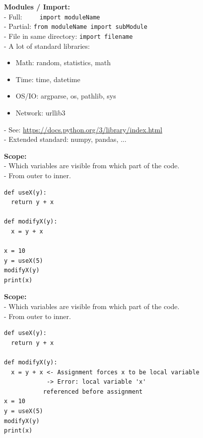 \documentclass{beamer}
\begin{document}
\begin{frame}[fragile]
	\textbf{Modules / Import:}\\
	- Full:~~~~~\texttt{import moduleName}\\
	- Partial: \texttt{from moduleName import subModule} \\
	- File in same directory: \texttt{import filename}\\
	- A lot of standard libraries:
	\begin{itemize}
		\item Math: random, statistics, math
		\item Time: time, datetime 
		\item OS/IO: argparse, os, pathlib, sys
		\item Network: urllib3
	\end{itemize}
	- See: \url{https://docs.python.org/3/library/index.html}\\
	- Extended standard: numpy, pandas, ...
	
	
\end{frame}

\begin{frame}[fragile]
	\textbf{Scope:}\\
	- Which variables are visible from which part of the code.\\
	- From outer to inner.\\
	\begin{example}
		\begin{verbatim}
def useX(y):
  return y + x

def modifyX(y):  
  x = y + x

x = 10
y = useX(5)
modifyX(y)
print(x)
		\end{verbatim}
	\end{example}
\end{frame}

\begin{frame}[fragile]
	\textbf{Scope:}\\
	- Which variables are visible from which part of the code.\\
	- From outer to inner.\\
	\begin{example}
		\begin{verbatim}
def useX(y):
  return y + x
		
def modifyX(y):  
  x = y + x <- Assignment forces x to be local variable
            -> Error: local variable 'x'
	       referenced before assignment
x = 10
y = useX(5)
modifyX(y)
print(x)
		\end{verbatim}
	\end{example}
\end{frame}
\end{document}
